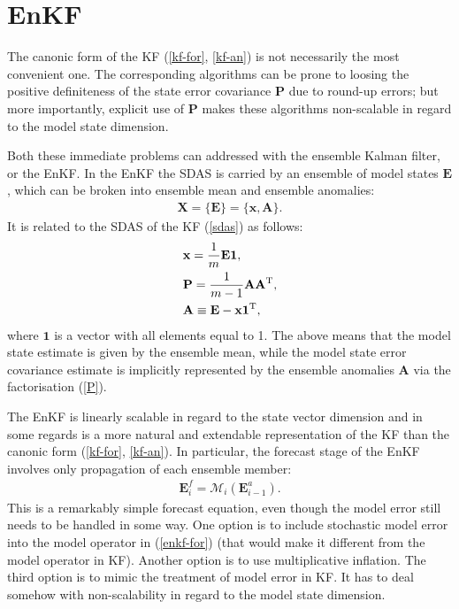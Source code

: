 \documentclass[11pt]{report}
\newcommand{\mb} {\mathbf}
\newcommand{\T}{^{\tiny \mathrm T}}
\begin{document}
\section{EnKF}

The canonic form of the KF (\ref{kf-for}, \ref{kf-an}) is not necessarily the most convenient one.
The corresponding algorithms can be prone to loosing the positive definiteness of the state error covariance $\mb P$ due to round-up errors; but more importantly, explicit use of $\mb P$ makes these algorithms non-scalable in regard to the model state dimension.

Both these immediate problems can addressed with the ensemble Kalman filter, or the EnKF.
In the EnKF the SDAS is carried by an ensemble of model states $\mb E$, which can be broken into ensemble mean and ensemble anomalies:
\begin{align}
  \label{sdas-enkf}
  \mb X = \{\mb E\} = \{\mb x, \mb A\}.
\end{align}
It is related to the SDAS of the KF (\ref{sdas}) as follows:
\begin{subequations}
  \label{E}
  \begin{align}
    \label{x}
    &\mb x = \frac{1}{m} \mb E \mb 1,\\
    \label{P}
    &\mb P = \frac{1}{m - 1} \mb A \mb A\T,\\
    \label{A}
    &\mb A \equiv \mb E - \mb x \mb 1\T,
  \end{align}
\end{subequations}
where $\mb 1$ is a vector with all elements equal to 1.
The above means that the model state estimate is given by the ensemble mean, while the model state error covariance estimate is implicitly represented by the ensemble anomalies $\mb A$ via the factorisation (\ref{P}).

The EnKF is linearly scalable in regard to the state vector dimension and in some regards is a more natural and extendable representation of the KF than the canonic form (\ref{kf-for}, \ref{kf-an}).
In particular, the forecast stage of the EnKF involves only propagation of each ensemble member:
\begin{align}
  \label{enkf-for}
  \mb E_i^f = \mathcal M_i(\mb E_{i-1}^a).
\end{align}
This is a remarkably simple forecast equation, even though the model error still needs to be handled in some way.
One option is to include stochastic model error into the model operator in (\ref{enkf-for}) (that would make it different from the model operator in KF).
Another option is to use multiplicative inflation.
The third option is to mimic the treatment of model error in KF.
It has to deal somehow with non-scalability in regard to the model state dimension.
\end{document}
